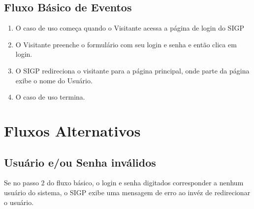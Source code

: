 \documentclass[11pt, a4paper,oneside]{book}
\begin{document}
\subsection{Fluxo Básico de Eventos}

\begin{enumerate}
\item O caso de uso começa quando o Visitante acessa a página de login do SIGP
\item O Visitante preenche o formulário com seu login e senha e então clica em login.
\item O SIGP redireciona o visitante para a página principal, onde parte da página exibe o nome do Usuário.
\item O caso de uso termina.
\end{enumerate}

\section{Fluxos Alternativos}

\subsection{Usuário e/ou Senha inválidos}
Se no passo $2$ do fluxo básico, o login e senha digitados corresponder a nenhum usuário do sistema, o SIGP exibe uma mensagem de erro ao invéz de redirecionar o usuário.

%
%
%
%
\end{document}
